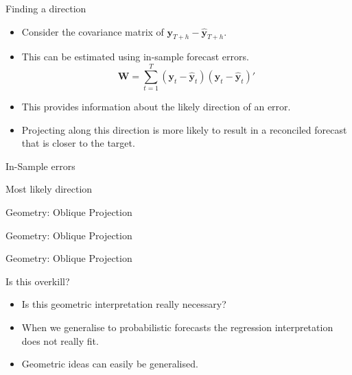 \documentclass{beamer}
\begin{document}
  \begin{frame}{Finding a direction}
  \begin{itemize}
  \item Consider the covariance matrix of ${\bm y}_{T+h}-\hat{\bm{y}}_{T+h}$.
   \pause
   \item This can be estimated using in-sample forecast errors.
   \begin{equation*}
   \bm{W}=\sum\limits_{t=1}^T ({\bm y}_{t}-\hat{\bm{y}}_{t})({\bm y}_{t}-\hat{\bm{y}}_{t})'
   \end{equation*}
  \pause
  \item This provides information about the likely direction of an error.
  \pause
  \item Projecting along this direction is more likely to result in a reconciled forecast that is closer to the target.
  \end{itemize}  
\end{frame}
\begin{frame}{In-Sample errors}
\vspace{-0.9cm}
\centering

\end{frame}
\begin{frame}{Most likely direction}
\vspace{-0.9cm}
\centering

\end{frame}
  \begin{frame}{Geometry: Oblique Projection}
\vspace{-0.9cm}
\centering

\end{frame}
  \begin{frame}{Geometry: Oblique Projection}
\vspace{-0.9cm}
\centering

\end{frame}
  \begin{frame}{Geometry: Oblique Projection}
   	\vspace{-0.9cm}
   	\centering
   	
  \end{frame}
  \begin{frame}{Is this overkill?}
  \begin{itemize}
  	\item Is this geometric interpretation really necessary?
  	\pause
  	\item When we generalise to probabilistic forecasts the regression interpretation does not really fit.
  	\pause
  	\item Geometric ideas can easily be generalised. 
  \end{itemize}
  \end{frame}
\end{document}
